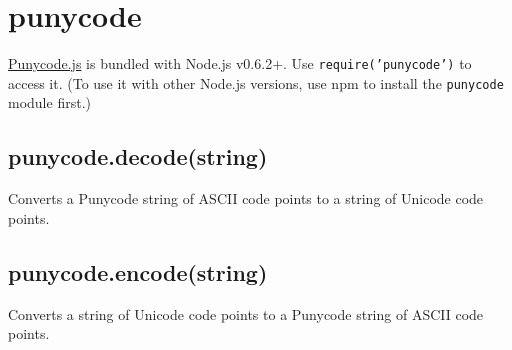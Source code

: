 \section{punycode}

\begin{Shaded}
\begin{Highlighting}[]
\NormalTok{: } 
\end{Highlighting}
\end{Shaded}

\href{http://mths.be/punycode}{Punycode.js} is bundled with Node.js
v0.6.2+. Use \texttt{require('punycode')} to access it. (To use it with
other Node.js versions, use npm to install the \texttt{punycode} module
first.)

\subsection{punycode.decode(string)}

Converts a Punycode string of ASCII code points to a string of Unicode
code points.

\begin{Shaded}
\begin{Highlighting}[]
\NormalTok{(}\NormalTok{); }
\NormalTok{(}\NormalTok{); }
\end{Highlighting}
\end{Shaded}

\subsection{punycode.encode(string)}

Converts a string of Unicode code points to a Punycode string of ASCII
code points.

\begin{Shaded}
\begin{Highlighting}[]
\NormalTok{(}\NormalTok{); }
\NormalTok{(}\NormalTok{); }
\end{Highlighting}
\end{Shaded}

